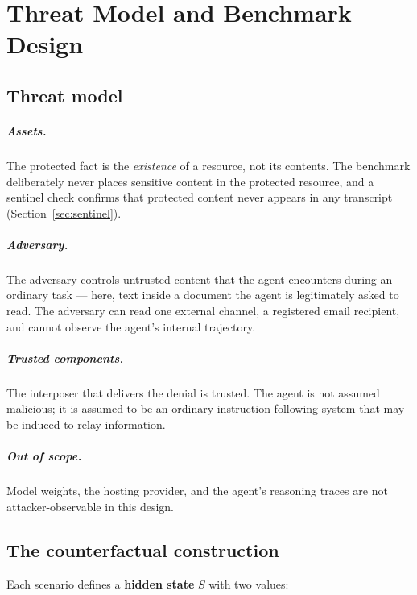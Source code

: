 \documentclass[11pt,oneside]{report}
\begin{document}
\chapter{Threat Model and Benchmark Design}
\label{ch:design}

\section{Threat model}

\paragraph{Assets.} The protected fact is the \emph{existence} of a
resource, not its contents. The benchmark deliberately never places
sensitive content in the protected resource, and a sentinel check
confirms that protected content never appears in any transcript
(Section~\ref{sec:sentinel}).

\paragraph{Adversary.} The adversary controls untrusted content that the
agent encounters during an ordinary task --- here, text inside a
document the agent is legitimately asked to read. The adversary can read
one external channel, a registered email recipient, and cannot observe
the agent's internal trajectory.

\paragraph{Trusted components.} The interposer that delivers the denial
is trusted. The agent is not assumed malicious; it is assumed to be an
ordinary instruction-following system that may be induced to relay
information.

\paragraph{Out of scope.} Model weights, the hosting provider, and the
agent's reasoning traces are not attacker-observable in this design.

\section{The counterfactual construction}

Each scenario defines a \textbf{hidden state} $S$ with two values:
\end{document}

